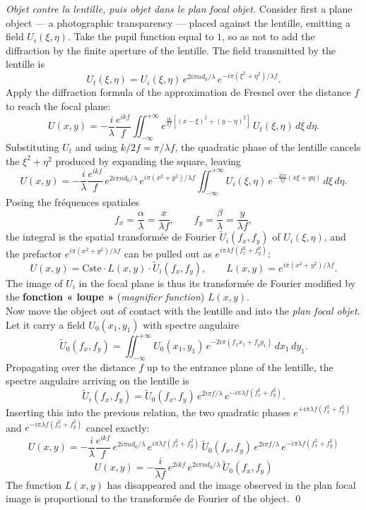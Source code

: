 \begin{proof}[Objet contre la lentille, puis objet dans le plan focal objet]
  Consider first a plane object --- a photographic transparency --- placed
  against the lentille, emitting a field $U_i(\xi,\eta)$. Take the pupil function
  equal to $1$, so as not to add the diffraction by the finite aperture of the
  lentille. The field transmitted by the lentille is
  \[
    U_t(\xi,\eta) = U_i(\xi,\eta)\, e^{2i\pi n d_0/\lambda}\,
                    e^{-i\pi(\xi^2+\eta^2)/\lambda f}.
  \]
  Apply the diffraction formula of the approximation de Fresnel over the
  distance $f$ to reach the focal plane:
  \[
    U(x,y) = -\frac{i}{\lambda}\frac{e^{ikf}}{f}
      \iint_{-\infty}^{+\infty}
      e^{\frac{ik}{2f}\left[(x-\xi)^2 + (y-\eta)^2\right]}\,
      U_t(\xi,\eta)\, d\xi\, d\eta .
  \]
  Substituting $U_t$ and using $k/2f = \pi/\lambda f$, the quadratic phase of the
  lentille cancels the $\xi^2 + \eta^2$ produced by expanding the square,
  leaving
  \[
    U(x,y) = -\frac{i}{\lambda}\frac{e^{ikf}}{f}\, e^{2i\pi n d_0/\lambda}\,
      e^{i\pi(x^2+y^2)/\lambda f}
      \iint_{-\infty}^{+\infty} U_i(\xi,\eta)\,
      e^{-\frac{2i\pi}{\lambda f}\left(x\xi + y\eta\right)}\, d\xi\, d\eta .
  \]
  Posing the fréquences spatiales
  \[
    f_x = \frac{\alpha}{\lambda} = \frac{x}{\lambda f},
    \qquad
    f_y = \frac{\beta}{\lambda} = \frac{y}{\lambda f},
  \]
  the integral is the spatial transformée de Fourier $\tilde{U}_i(f_x,f_y)$ of
  $U_i(\xi,\eta)$, and the prefactor $e^{i\pi(x^2+y^2)/\lambda f}$ can be pulled
  out as $e^{i\pi\lambda f (f_x^2 + f_y^2)}$:
  \[
    U(x,y) = \text{Cste}\cdot L(x,y)\cdot \tilde{U}_i(f_x,f_y),
    \qquad
    L(x,y) = e^{i\pi(x^2+y^2)/\lambda f}.
  \]
  The image of $U_i$ in the focal plane is thus its transformée de Fourier
  modified by the \textbf{fonction « loupe »} (\textit{magnifier function})
  $L(x,y)$.\\

  Now move the object out of contact with the lentille and into the \emph{plan
  focal objet}. Let it carry a field $U_0(x_1,y_1)$ with spectre angulaire
  \[
    \tilde{U}_0(f_x,f_y) = \iint_{-\infty}^{+\infty} U_0(x_1,y_1)\,
      e^{-2i\pi\left(f_x x_1 + f_y y_1\right)}\, dx_1\, dy_1 .
  \]
  Propagating over the distance $f$ up to the entrance plane of the lentille, the
  spectre angulaire arriving on the lentille is
  \[
    \tilde{U}_i(f_x,f_y) = \tilde{U}_0(f_x,f_y)\, e^{2i\pi f/\lambda}\,
      e^{-i\pi\lambda f\left(f_x^2 + f_y^2\right)} .
  \]
  Inserting this into the previous relation, the two quadratic phases
  $e^{+i\pi\lambda f(f_x^2+f_y^2)}$ and $e^{-i\pi\lambda f(f_x^2+f_y^2)}$ cancel
  exactly:
  \[
    U(x,y) = -\frac{i}{\lambda}\frac{e^{ikf}}{f}\, e^{2i\pi n d_0/\lambda}\,
       e^{i\pi\lambda f (f_x^2+f_y^2)}\, \tilde{U}_0(f_x,f_y)\,
       e^{2i\pi f/\lambda}\, e^{-i\pi\lambda f(f_x^2+f_y^2)}
  \]
  \[
    \boxed{\;
      U(x,y) = -\frac{i}{\lambda f}\, e^{2ikf}\, e^{2i\pi n d_0/\lambda}\,
               \tilde{U}_0(f_x,f_y)
    \;}
  \]
  The function $L(x,y)$ has disappeared and the image observed in the plan
  focal image is proportional to the transformée de Fourier of the object. \qed
\end{proof}

